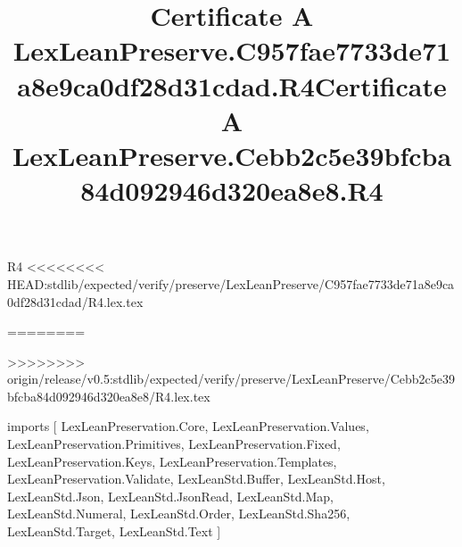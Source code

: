 \begin{lexlean}{R4}
<<<<<<<< HEAD:stdlib/expected/verify/preserve/LexLeanPreserve/C957fae7733de71a8e9ca0df28d31cdad/R4.lex.tex
\title{Certificate A LexLeanPreserve.C957fae7733de71a8e9ca0df28d31cdad.R4}
========
\title{Certificate A LexLeanPreserve.Cebb2c5e39bfcba84d092946d320ea8e8.R4}
>>>>>>>> origin/release/v0.5:stdlib/expected/verify/preserve/LexLeanPreserve/Cebb2c5e39bfcba84d092946d320ea8e8/R4.lex.tex
\begin{coremodule}
imports [
  LexLeanPreservation.Core,
  LexLeanPreservation.Values,
  LexLeanPreservation.Primitives,
  LexLeanPreservation.Fixed,
  LexLeanPreservation.Keys,
  LexLeanPreservation.Templates,
  LexLeanPreservation.Validate,
  LexLeanStd.Buffer,
  LexLeanStd.Host,
  LexLeanStd.Json,
  LexLeanStd.JsonRead,
  LexLeanStd.Map,
  LexLeanStd.Numeral,
  LexLeanStd.Order,
  LexLeanStd.Sha256,
  LexLeanStd.Target,
  LexLeanStd.Text
]


\end{coremodule}
\end{lexlean}
